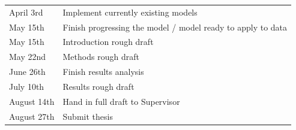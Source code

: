 \begin{center}
	\begin{table}[!h]

		\vspace{2mm}
		\begin{tabular}{ p{3cm}   p{10cm} } 
			
			April 3rd & Implement currently existing models \\ 
			May 15th & Finish progressing the model / model ready to apply to data\\
			May 15th & Introduction rough draft\\
			May 22nd & Methods rough draft\\
			June 26th & Finish results analysis\\
			July 10th & Results rough draft\\
			August 14th & Hand in full draft to Supervisor\\
			August 27th & Submit thesis\\
	
		\end{tabular}
	\end{table}	
\end{center}
\renewcommand\sfdefault{phv}
\renewcommand\mddefault{mc}
\renewcommand\bfdefault{bc}
\sffamily
